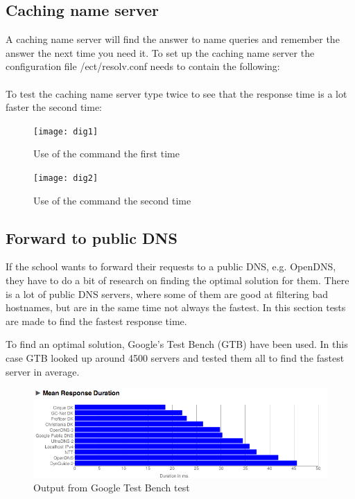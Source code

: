 \documentclass[Main]{subfiles}
\begin{document}
\subsection{Caching name server}
A caching name server will find the answer to name queries and remember the answer the next time you need it. To set up the caching name server the configuration file /ect/resolv.conf needs to contain the following:\\ \\
To test the caching name server type  twice to see that the response time is a lot faster the second time:

\begin{figure}[H]
\begin{minipage}[b]{0.45\linewidth}
\centering
\texttt{[image: dig1]}
\caption{Use of the command  the first time}
\label{fig:dig1}
\end{minipage}
\hspace{0.5cm}
\begin{minipage}[b]{0.45\linewidth}
\centering
\texttt{[image: dig2]}
\caption{Use of the command  the second time}
\label{fig:dig2}
\end{minipage}
\end{figure}

\subsection{Forward to public DNS}
If the school wants to forward their requests to a public DNS, e.g. OpenDNS, they have to do a bit of research on finding the optimal solution for them. 
There is a lot of public DNS servers, where some of them are good at filtering bad hostnames, but are in the same time not always the fastest.
In this section tests are made to find the fastest response time.

To find an optimal solution, Google's Test Bench (GTB) have been used.
In this case GTB looked up around 4500 servers and tested them all to find the fastest server in average.

\begin{figure}[H]
\centering
\includegraphics[scale=0.5]{Figurer/NamebenchTest.png}
\caption{Output from Google Test Bench test}
\label{fig:testBench}
\end{figure}
\end{document}
